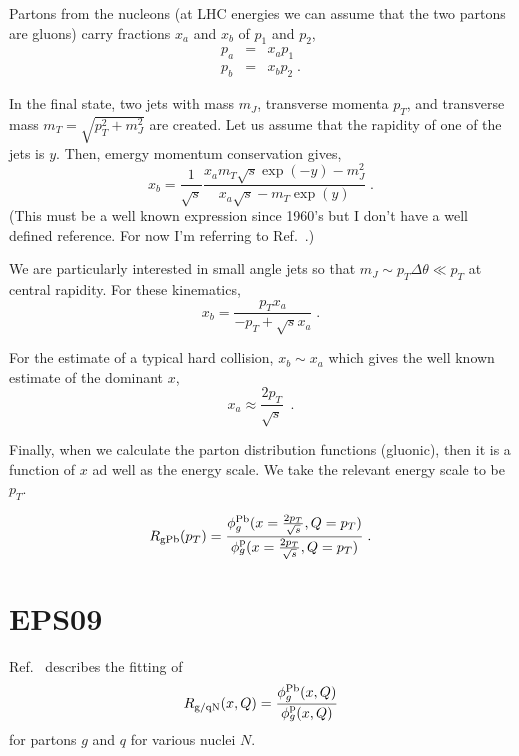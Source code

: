 \documentclass[aps,prd,%
 ]{revtex4}
\begin{document}
Partons from the nucleons (at LHC energies we can assume that the two partons
are gluons) carry fractions $x_a$ and $x_b$ of $p_1$ and $p_2$,
\begin{eqnarray}
p_a &=& x_a p_1 \\
p_b &=&  x_b p_2 \;.
\end{eqnarray}

In the final state, two jets with mass $m_J$, transverse momenta $p_T$,
and transverse mass $m_T=\sqrt{p_T^2+m_J^2}$ are created. Let us assume that
the rapidity of one of the jets is $y$. Then, emergy momentum conservation
gives,
\begin{equation}
x_b = 
  \frac{1}{\sqrt{s}}
  \frac{x_am_T\sqrt{s}\exp(-y) - m_J^2}{x_a\sqrt{s} - m_T\exp(y)}\;.
\end{equation}
(This must be a well known expression since 1960's but I don't have a well
defined reference. For now I'm referring to Ref.~\cite{Sharma:2012dy}.)

We are particularly interested in small angle jets so that $m_J \sim p_T
\Delta\theta \ll p_T$ at central rapidity. For these kinematics,
\begin{equation}
x_b = \frac{p_T x_a}{-p_T + \sqrt{s} x_a}\;.
\end{equation}

For the estimate of a typical hard collision, $x_b\sim x_a$ which gives the
well known estimate of the dominant $x$,
\begin{equation}
x_a \approx \frac{2 p_T}{\sqrt{s}}~\;.\label{eq:xestimate}
\end{equation}

Finally, when we calculate the parton distribution functions (gluonic), then it
is a function of $x$ ad well as the energy scale. We take the relevant energy scale to
be $p_T$.

\begin{equation}
R_{\rm{gPb}}(p_T) = \frac{\phi_g^{\rm{Pb}}(x=\frac{2p_T}{\sqrt{s}}, Q=p_T)}
{\phi_g^{\rm{p}}(x=\frac{2p_T}{\sqrt{s}}, Q=p_T)}\;. \label{eq:RgPb}
\end{equation}

\section{EPS09}
Ref.~\cite{Eskola:2009uj} describes the fitting of 
\begin{equation}
R_{\rm{g/q N}}(x, Q) = \frac{\phi_g^{\rm{Pb}}(x, Q)} {\phi_g^{\rm{p}}(x, Q)}
\end{equation}
for partons $g$ and $q$ for various nuclei $N$. 
\end{document}
